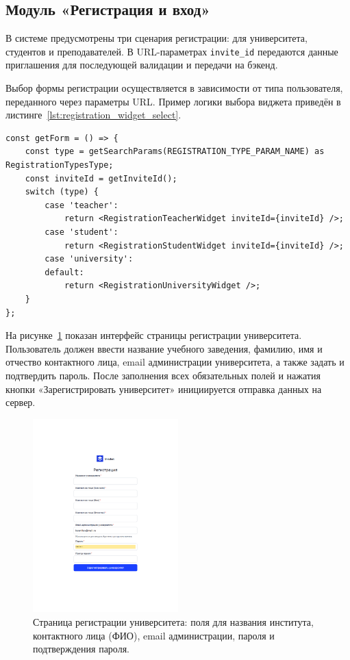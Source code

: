 \subsection{Модуль «Регистрация и вход»}

В системе предусмотрены три сценария регистрации: для университета, студентов и преподавателей. В URL-параметрах \texttt{invite\_id} передаются данные приглашения для последующей валидации и передачи на бэкенд.

Выбор формы регистрации осуществляется в зависимости от типа пользователя, переданного через параметры URL. Пример логики выбора виджета приведён в листинге~\ref{lst:registration_widget_select}.

\begin{lstlisting}[caption={Выбор виджета регистрации по типу}, label={lst:registration_widget_select}]
const getForm = () => {
    const type = getSearchParams(REGISTRATION_TYPE_PARAM_NAME) as RegistrationTypesType;
    const inviteId = getInviteId();
    switch (type) {
        case 'teacher':
            return <RegistrationTeacherWidget inviteId={inviteId} />;
        case 'student':
            return <RegistrationStudentWidget inviteId={inviteId} />;
        case 'university':
        default:
            return <RegistrationUniversityWidget />;
    }
};
\end{lstlisting}
На рисунке~\ref{fig:registration_university} показан интерфейс страницы регистрации университета. Пользователь должен ввести название учебного заведения, фамилию, имя и отчество контактного лица, email администрации университета, а также задать и подтвердить пароль. После заполнения всех обязательных полей и нажатия кнопки «Зарегистрировать университет» инициируется отправка данных на сервер.

\begin{figure}[H]
    \centering
    \includegraphics[width=0.5\textwidth]{static/presintation/RegPage.png} %
    \caption{Страница регистрации университета: поля для названия института, контактного лица (ФИО), email администрации, пароля и подтверждения пароля.}
    \label{fig:registration_university}
\end{figure}

